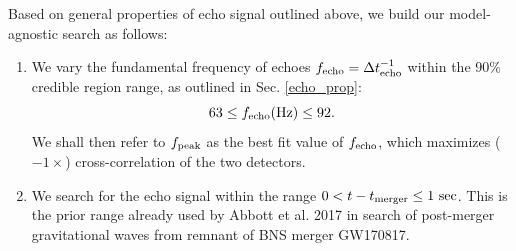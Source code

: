 \documentclass[12pt]{article}
\begin{document}
Based on general properties of echo signal outlined above, we build our model-agnostic search as follows:
\begin{enumerate}
\item We vary the fundamental frequency of echoes  $f_{\rm echo}= \Delta t_{\rm echo}^{-1}$ within the 90\% credible region range, as outlined in Sec. \ref{echo_prop}:
$$
63 \leq f_{{\rm echo} }({\rm Hz}) \leq 92.
$$
We shall then refer to $f_{\rm{peak}}$ as the best fit value of $f_{\rm echo}$, which maximizes ($-1\times$) cross-correlation of the two detectors. 




\item We search for the echo signal within the range $0 <t-t_{\rm{merger}} \leq 1~ \rm{sec}$. This is the prior range already used by Abbott et al. 2017 \cite{Abbott:2017dke} in search of post-merger gravitational waves from remnant of BNS merger GW170817.


\end{enumerate}
\end{document}
